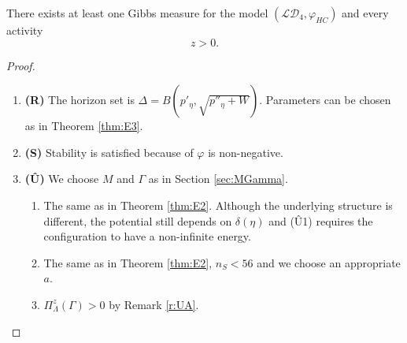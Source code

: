 \begin{theorem}\label{thm:E4}
	There exists at least one Gibbs measure for the model $(\mathcal {LD}_4,\varphi_{HC})$ and every activity $$z>0.$$
\end{theorem}
\begin{proof}
\begin{enumerate}[]
	\item \textbf{(R)} The horizon set is $\Delta = B(p'_\eta,\sqrt{p''_\eta +W})$. Parameters can be chosen as in Theorem \ref{thm:E3}. 
	\item \textbf{(S)} Stability is satisfied because of $\varphi$ is non-negative.
	\item \textbf{(\^U)} We choose $M$ and $\Gamma$ as in Section \ref{sec:MGamma}.
		\begin{enumerate}[(U1)]
			\item The same as in Theorem \ref{thm:E2}. Although the underlying structure is different, the potential still depends on $\delta(\eta)$ and (\^U1) requires the configuration to have a non-infinite energy.
			\item The same as in Theorem \ref{thm:E2}, $n_S<56$ and we choose an appropriate $a$.
			\item $\Pi^z_\Lambda(\Gamma)>0$ by Remark \ref{r:UA}.
		\end{enumerate}
\end{enumerate}
\end{proof}



\begin{remark}
	\tbd
{}
\end{remark}


\begin{remark}
	\tbd
\end{remark}
